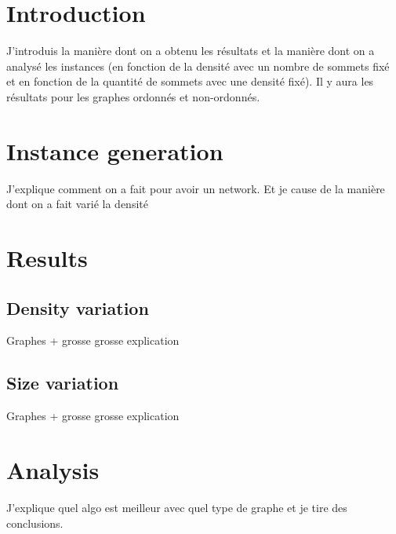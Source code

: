 \section{Introduction}
J'introduis la manière dont on a obtenu les résultats et la manière dont on a analysé les instances (en fonction de la densité avec un nombre de sommets fixé et en fonction de la quantité de sommets avec une densité fixé). Il y aura les résultats pour les graphes ordonnés et non-ordonnés.
\section{Instance generation}
J'explique comment on a fait pour avoir un network. Et je cause de la manière dont on a fait varié la densité
\section{Results}

\subsection{Density variation}
Graphes + grosse grosse explication
\subsection{Size variation}
Graphes + grosse grosse explication
\section{Analysis}
J'explique quel algo est meilleur avec quel type de graphe et je tire des conclusions.